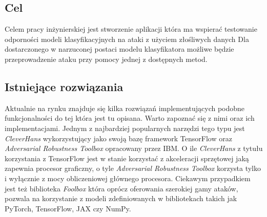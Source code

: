 \documentclass[
    left=2.5cm,         %
    right=2.5cm,        %
    top=2.5cm,          %
    bottom=3cm,         %
    bindingoffset=6mm,  %
    nohyphenation=false %
]{eiti/eiti-thesis}
\begin{document}
\subsection{Cel}
\label{sec:target}

Celem pracy inżynierskiej jest stworzenie aplikacji która ma wspierać testowanie
odporności modeli klasyfikacyjnych na ataki z użyciem złośliwych danych
Dla dostarczonego w narzuconej postaci modelu klasyfikatora możliwe będzie
przeprowadzenie ataku przy pomocy jednej z dostępnych metod.

\subsection{Istniejące rozwiązania}

Aktualnie na rynku znajduje się kilka rozwiązań implementujących podobne funkcjonalności
do tej która jest tu opisana. Warto zapoznać się z nimi oraz ich implementacjami.
Jednym z najbardziej popularnych narzędzi tego typu jest \textit{CleverHans}\cite{DBLP:journals/corr/GoodfellowPM16}
wykorzystujący jako swoją bazę framework TensorFlow oraz \textit{Adversarial Robustness Toolbox}\cite{DBLP:journals/corr/abs-1807-01069} opracowany przez IBM.
O ile \textit{CleverHans} z tytułu korzystania z TensorFlow jest w stanie korzystać z akceleracji sprzętowej jaką zapewnia procesor graficzny, o tyle
\textit{Adversarial Robustness Toolbox} korzysta tylko i wyłącznie z mocy obliczeniowej głównego procesora. Ciekawym przypadkiem jest też
biblioteka \textit{Foolbox}\cite{rauber2017foolbox} która oprócz oferowania szerokiej gamy ataków, pozwala na korzystanie z modeli
zdefiniowanych w bibliotekach takich jak PyTorch\cite{NEURIPS2019_9015}, TensorFlow\cite{DBLP:journals/corr/AbadiABBCCCDDDG16}, JAX\cite{jax2018github} czy NumPy\cite{numpy}.
\end{document}
